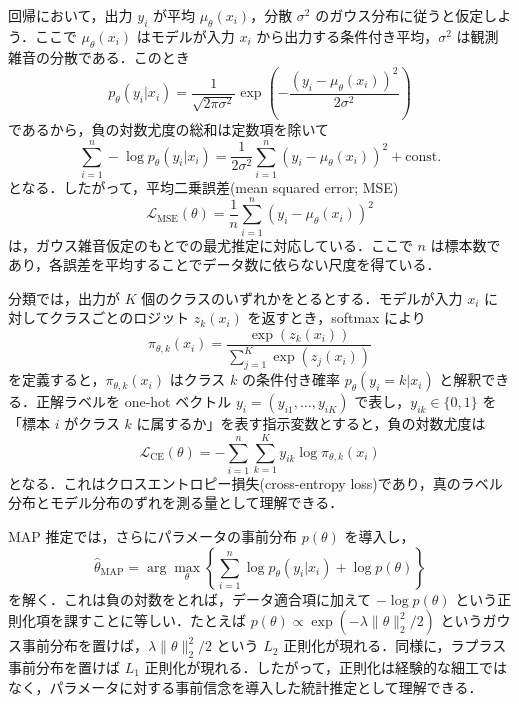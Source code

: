 回帰において，出力 $y_i$ が平均 $\mu_\theta(x_i)$，分散 $\sigma^2$ のガウス分布に従うと仮定しよう．ここで $\mu_\theta(x_i)$ はモデルが入力 $x_i$ から出力する条件付き平均，$\sigma^2$ は観測雑音の分散である．このとき
\begin{equation}
p_\theta(y_i|x_i)
= \frac{1}{\sqrt{2\pi\sigma^2}}
\exp\left(
-\frac{(y_i-\mu_\theta(x_i))^2}{2\sigma^2}
\right)
\end{equation}
であるから，負の対数尤度の総和は定数項を除いて
\begin{equation}
\sum_{i=1}^n -\log p_\theta(y_i|x_i)
= \frac{1}{2\sigma^2}\sum_{i=1}^n(y_i-\mu_\theta(x_i))^2 + \mathrm{const.}
\end{equation}
となる．したがって，平均二乗誤差(mean squared error; MSE)
\begin{equation}
\mathcal L_{\mathrm{MSE}}(\theta)
= \frac{1}{n}\sum_{i=1}^n(y_i-\mu_\theta(x_i))^2
\end{equation}
は，ガウス雑音仮定のもとでの最尤推定に対応している．ここで $n$ は標本数であり，各誤差を平均することでデータ数に依らない尺度を得ている．

分類では，出力が $K$ 個のクラスのいずれかをとるとする．モデルが入力 $x_i$ に対してクラスごとのロジット $z_k(x_i)$ を返すとき，softmax により
\begin{equation}
\pi_{\theta,k}(x_i)
= \frac{\exp(z_k(x_i))}{\sum_{j=1}^K \exp(z_j(x_i))}
\end{equation}
を定義すると，$\pi_{\theta,k}(x_i)$ はクラス $k$ の条件付き確率 $p_\theta(y_i=k|x_i)$ と解釈できる．正解ラベルを one-hot ベクトル $y_i=(y_{i1},\dots,y_{iK})$ で表し，$y_{ik}\in\{0,1\}$ を「標本 $i$ がクラス $k$ に属するか」を表す指示変数とすると，負の対数尤度は
\begin{equation}
\mathcal L_{\mathrm{CE}}(\theta)
= -\sum_{i=1}^n \sum_{k=1}^K y_{ik}\log \pi_{\theta,k}(x_i)
\end{equation}
となる．これはクロスエントロピー損失(cross-entropy loss)であり，真のラベル分布とモデル分布のずれを測る量として理解できる．

MAP 推定では，さらにパラメータの事前分布 $p(\theta)$ を導入し，
\begin{equation}
\hat\theta_{\mathrm{MAP}}
= \arg\max_\theta
\left\{
\sum_{i=1}^n \log p_\theta(y_i|x_i)+ \log p(\theta)
\right\}
\end{equation}
を解く．これは負の対数をとれば，データ適合項に加えて $-\log p(\theta)$ という正則化項を課すことに等しい．たとえば $p(\theta)\propto \exp(-\lambda \|\theta\|_2^2/2)$ というガウス事前分布を置けば，$\lambda \|\theta\|_2^2/2$ という $L_2$ 正則化が現れる．同様に，ラプラス事前分布を置けば $L_1$ 正則化が現れる．したがって，正則化は経験的な細工ではなく，パラメータに対する事前信念を導入した統計推定として理解できる．


